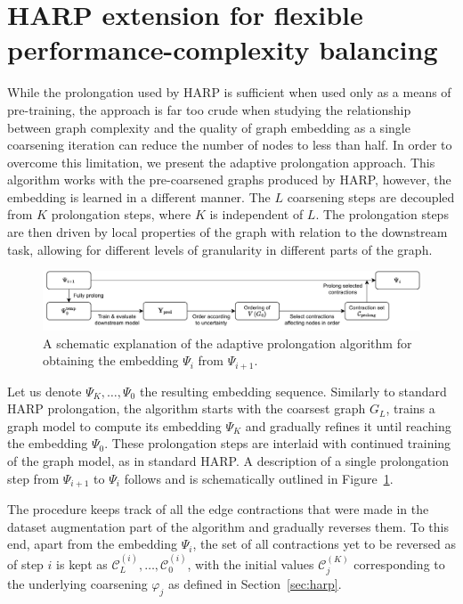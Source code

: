 \section{HARP extension for flexible performance-complexity balancing}\label{sec:our-method}

While the prolongation used by HARP is sufficient when used only as a means of pre-training, the approach is far too crude when studying the relationship between graph complexity and the quality of graph embedding as a single coarsening iteration can reduce the number of nodes to less than half. In order to overcome this limitation, we present the adaptive prolongation approach. This algorithm works with the pre-coarsened graphs produced by HARP, however, the embedding is learned in a different manner. The \( L \) coarsening steps are decoupled from \( K \) prolongation steps, where \( K \) is independent of \( L \). The prolongation steps are then driven by local properties of the graph with relation to the downstream task, allowing for different levels of granularity in different parts of the graph.

\begin{figure}
	\centering
	\includegraphics[width=\textwidth]{images/adaptive-prolongation/adaptive-prolongation.pdf}
	\caption{A schematic explanation of the adaptive prolongation algorithm for obtaining the embedding \( \Psi_{i} \) from \( \Psi_{i + 1} \).}
	\label{fig:adaptive-prolongation}
\end{figure}

Let us denote \( \Psi_K, \dots, \Psi_0 \) the resulting embedding sequence. Similarly to standard HARP prolongation, the algorithm starts with the coarsest graph \( G_L \), trains a graph model to compute its embedding \( \Psi_K \) and gradually refines it until reaching the embedding \( \Psi_0 \). These prolongation steps are interlaid with continued training of the graph model, as in standard HARP. A description of a single prolongation step from \( \Psi_{i + 1} \) to \( \Psi_i \) follows and is schematically outlined in Figure~\ref{fig:adaptive-prolongation}.

The procedure keeps track of all the edge contractions that were made in the dataset augmentation part of the algorithm and gradually reverses them. To this end, apart from the embedding \( \Psi_i \), the set of all contractions yet to be reversed as of step \( i \) is kept as \( \mathcal{C}_L^{(i)}, \dots, \mathcal{C}_0^{(i)} \), with the initial values \( \mathcal{C}_j^{(K)} \) corresponding to the underlying coarsening \( \varphi_j \) as defined in Section~\ref{sec:harp}.

